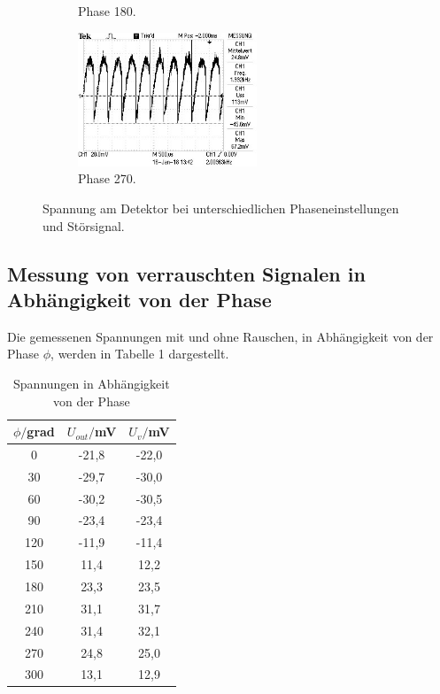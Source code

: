 \begin{figure}
\begin{subfigure}{0.48\textwidth}
    \caption{Phase 180.}
    \label{fig:phase180v}
  \end{subfigure}
  \begin{subfigure}{0.48\textwidth}
    \centering
    \includegraphics[height=4cm]{phase270v.jpg}
    \caption{Phase 270.}
    \label{fig:phase270v}
  \end{subfigure}
  \caption{Spannung am Detektor bei unterschiedlichen Phaseneinstellungen und Störsignal.}
  \label{fig:logosv}
\end{figure}

\FloatBarrier

\subsection{Messung von verrauschten Signalen in Abhängigkeit von der Phase}

Die gemessenen Spannungen mit und ohne Rauschen, in Abhängigkeit von der Phase $\phi$, werden in Tabelle 1 dargestellt.

\begin{table}[H]
  \centering
  \caption{Spannungen in Abhängigkeit von der Phase}
  \label{tab:Phase}
  \begin{tabular}{c c c}
    \toprule
    $\phi/$grad  &  $U_{out}/$mV &  $U_v/$mV \\
    \midrule
    0     &  -21,8   &  -22,0 \\
    30    &  -29,7   &  -30,0 \\
    60    &  -30,2   &  -30,5 \\
    90    &  -23,4   &  -23,4 \\
    120   &  -11,9   &  -11,4 \\
    150   &   11,4   &   12,2 \\
    180   &   23,3   &   23,5 \\
    210   &   31,1   &   31,7 \\
    240   &   31,4   &   32,1 \\
    270   &   24,8   &   25,0 \\
    300   &   13,1   &   12,9 \\
    \bottomrule
  \end{tabular}
\end{table}

